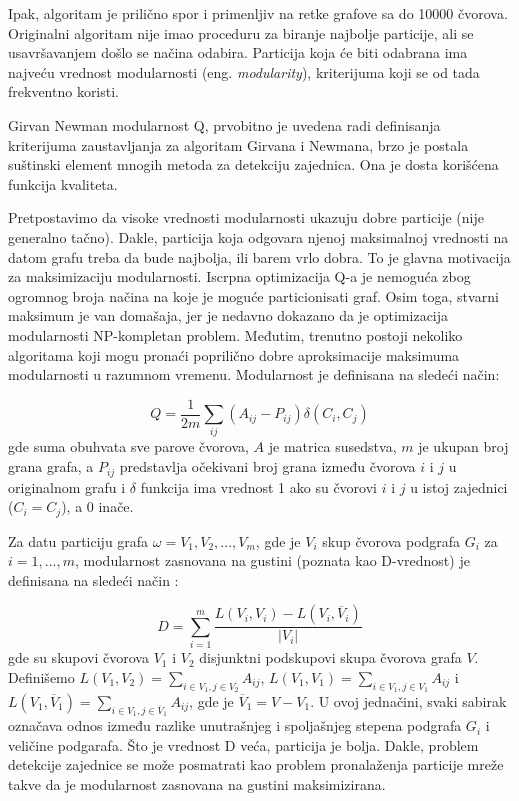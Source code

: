 \documentclass[a4paper]{article}
\begin{document}
Ipak, algoritam je prilično spor i primenljiv na retke grafove sa do 10000 čvorova. Originalni algoritam nije imao proceduru za biranje najbolje particije, ali se usavršavanjem došlo se načina odabira. Particija koja će biti odabrana ima najveću vrednost modularnosti (eng. \textit{modularity}), kriterijuma koji se od tada frekventno koristi. 

Girvan Newman modularnost Q, prvobitno je uvedena radi definisanja kriterijuma zaustavljanja za algoritam Girvana i Newmana, brzo je postala suštinski element mnogih metoda za detekciju zajednica. Ona je dosta korišćena funkcija kvaliteta.

Pretpostavimo da visoke vrednosti modularnosti ukazuju dobre particije (nije generalno tačno). Dakle, particija koja odgovara njenoj maksimalnoj vrednosti na datom grafu treba da bude najbolja, ili barem vrlo dobra. To je glavna motivacija za maksimizaciju modularnosti. Iscrpna optimizacija Q-a je nemoguća zbog ogromnog broja načina na koje je moguće particionisati graf. Osim toga, stvarni maksimum je van domašaja, jer je nedavno dokazano da je optimizacija modularnosti NP-kompletan problem. Međutim, trenutno postoji nekoliko algoritama koji mogu pronaći poprilično dobre aproksimacije maksimuma modularnosti u razumnom vremenu.
Modularnost je definisana na sledeći način:

\begin{equation} Q = \frac{1}{2m} \sum_{ij}{}(A_{ij} - P_{ij}) \delta(C_{i}, C_{j})
\end{equation}
gde suma obuhvata sve parove čvorova, $A$ je matrica susedstva, $m$ je ukupan broj grana grafa, a $P_{ij}$ predstavlja očekivani broj grana između čvorova $i$ i $j$ u originalnom grafu i $\delta$ funkcija ima vrednost 1 ako su čvorovi $i$ i $j$ u istoj zajednici ($C_{i} = C_{j}$), a 0 inače.

Za datu particiju grafa $\omega = {V_{1}, V_{2}, ..., V_{m}}$, gde je $V_{i}$ skup čvorova podgrafa $G_{i}$ za $i = 1,...,m$, modularnost zasnovana na gustini (poznata kao D-vrednost) je definisana na sledeći način \cite{li2008quantitative}:

\begin{equation} D = \sum_{i = 1}^{m} \frac{L(V_{i},  V_{i}) - L(V_{i}, \overline V_{i})}{|V_{i}|} 
\end{equation}
gde su skupovi čvorova $V_{1}$ i $V_{2}$ disjunktni podskupovi skupa čvorova grafa $V$. Definišemo $L(V_{1}, V_{2}) = \sum_{i \in V_1, j \in V_2} A_{ij}$, $L(V_{1},  V_{1}) = \sum_{i \in V_1, j \in V_1} A_{ij}$ i $L(V_{1}, \overline V_{1}) = \sum_{i \in V_1, j \in \overline V_1} A_{ij}$, gde je  $\overline V_{1} = V - V_{1}$. 
U ovoj jednačini, svaki sabirak označava odnos između razlike unutrašnjeg i spoljašnjeg stepena podgrafa $G_{i}$ i veličine podgarafa. Što je vrednost D veća, particija je bolja. Dakle, problem detekcije zajednice se može posmatrati kao problem pronalaženja particije mreže takve da je modularnost zasnovana na gustini maksimizirana.
\end{document}

